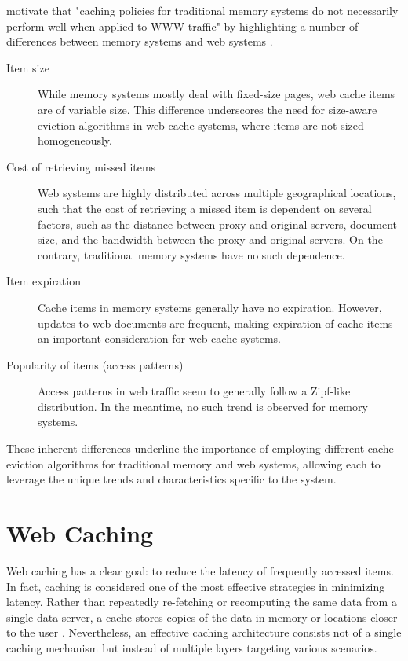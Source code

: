\citeauthor{web-cache-overview} motivate that "caching policies for traditional memory systems do not necessarily perform well when applied to WWW traffic" by highlighting a number of differences between memory systems and web systems \cite{web-cache-overview}.

\begin{description}
    \item[Item size] While memory systems mostly deal with fixed-size pages, web cache items are of variable size. This difference underscores the need for size-aware eviction algorithms in web cache systems, where items are not sized homogeneously.
    \item[Cost of retrieving missed items] Web systems are highly distributed across multiple geographical locations, such that the cost of retrieving a missed item is dependent on several factors, such as the distance between proxy and original servers, document size, and the bandwidth between the proxy and original servers. On the contrary, traditional memory systems have no such dependence.
    \item[Item expiration] Cache items in memory systems generally have no expiration. However, updates to web documents are frequent, making expiration of cache items an important consideration for web cache systems.
    \item[Popularity of items (access patterns)] Access patterns in web traffic seem to generally follow a Zipf-like distribution. In the meantime, no such trend is observed for memory systems.
\end{description}

These inherent differences underline the importance of employing different cache eviction algorithms for traditional memory and web systems, allowing each to leverage the unique trends and characteristics specific to the system.

\section{Web Caching}


Web caching has a clear goal: to reduce the latency of frequently accessed items. In fact, caching is considered one of the most effective strategies in minimizing latency. Rather than repeatedly re-fetching or recomputing the same data from a single data server, a cache stores copies of the data in memory or locations closer to the user \cite{latency-caching, web-cache-performance}. Nevertheless, an effective caching architecture consists not of a single caching mechanism but instead of multiple layers targeting various scenarios.

